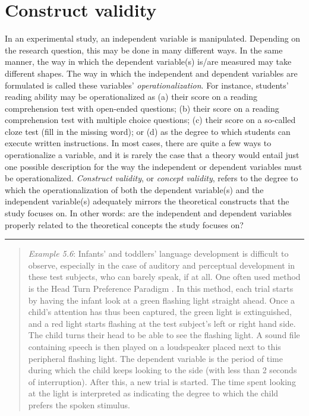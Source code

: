 \documentclass[
]{book}
\begin{document}
\hypertarget{sec:constructvalidity}{%
\section{Construct validity}\label{sec:constructvalidity}}

In an experimental study, an independent variable is manipulated. Depending on the research question, this may be done in many different ways. In the same manner, the way in which the dependent variable(s) is/are measured may take different shapes. The way in which the independent and dependent variables are formulated is called these variables' \emph{operationalization}. For instance, students' reading ability may be operationalized as (a) their score on a reading comprehension test with open-ended questions; (b) their score on a reading comprehension test with multiple choice questions; (c) their score on a so-called cloze test (fill in the missing word); or (d) as the degree to which students can execute written instructions. In most cases, there are quite a few ways to operationalize a variable, and it is rarely the case that a theory would entail just one possible description for the way the independent or dependent variables must be operationalized. \emph{Construct validity}, or \emph{concept validity}, refers to the degree to which the operationalization of both the dependent variable(s) and the independent variable(s) adequately mirrors the theoretical constructs that the study focuses on. In other words: are the independent and dependent variables properly related to the theoretical concepts the study focuses on?

\begin{center}\rule{0.5\linewidth}{0.5pt}\end{center}

\begin{quote}
\emph{Example 5.6}: Infants' and toddlers' language development is difficult to observe, especially in the case of auditory and perceptual development in these test subjects, who can barely speak, if at all. One often used method is the Head Turn Preference Paradigm \citep{John10}. In this method, each trial starts by having the infant look at a green flashing light straight ahead. Once a child's attention has thus been captured, the green light is extinguished, and a red light starts flashing at the test subject's left or right hand side. The child turns their head to be able to see the flashing light. A sound file containing speech is then played on a loudspeaker placed next to this peripheral flashing light. The dependent variable is the period of time during which the child keeps looking to the side (with less than 2 seconds of interruption). After this, a new trial is started. The time spent looking at the light is interpreted as indicating the degree to which the child prefers the spoken stimulus.
\end{quote}
\end{document}
